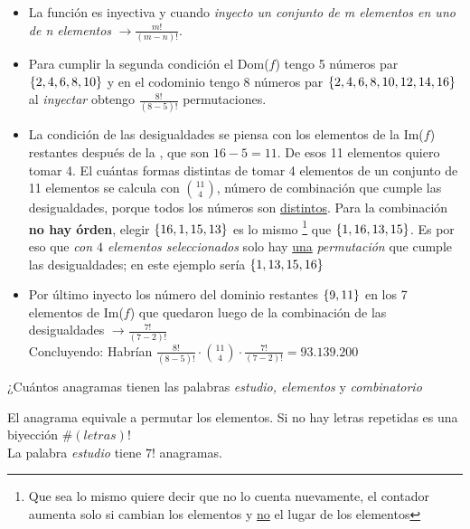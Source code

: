 \documentclass[12pt,a4paper, spanish]{article}
\begin{document}
\begin{itemize}
	\item
	      La función es inyectiva y cuando \textit{inyecto un conjunto de m elementos en uno de n elementos } $\to \frac{m!}{(m-n)!}$.

	\item
	      Para cumplir la segunda condición el Dom($f$) tengo 5 números par $\left\{ 2,4,6,8,10 \right\}$ y en el codominio tengo 8 números par
	      $\set{\foreach \i in {2,4,...,14}{\i,}16}$ al \textit{inyectar} obtengo $\frac{8!}{(8-5)!}$ permutaciones.

	\item
	      La condición de las desigualdades se piensa con los elementos de la Im($f$) restantes después de la , que son $16 - 5 = 11$.
	      De esos 11 elementos quiero tomar 4. El cuántas formas distintas de tomar 4 elementos de un conjunto de 11 elementos se calcula con $\binom{11}{4}$,
	      número de combinación que cumple las desigualdades, porque todos los números son \underline{distintos}. Para la combinación
	      \textbf{no hay órden}, elegir $\left\{ 16,1,15,13 \right\}$ es lo mismo
	      \footnote{Que sea lo mismo quiere decir que no lo cuenta nuevamente, el contador aumenta solo si cambian los
		      elementos y \underline{no} el lugar de los elementos}
	      que $\left\{ 1,16,13,15 \right\}$. Es por eso que \textit{con $4$ elementos seleccionados}
	      solo hay \underline{una} \textit{permutación} que cumple las desigualdades; en este ejemplo sería $\left\{ 1,13,15,16 \right\}$

	\item
	      Por último inyecto los número del dominio restantes $\left\{ 9,11 \right\}$ en los 7 elementos de Im($f$) que quedaron luego de la combinación de las
	      desigualdades $\to \frac{7!}{(7-2)!}$\\

	      Concluyendo: Habrían $\frac{8!}{(8-5)!} \cdot \binom{11}{4} \cdot \frac{7!}{(7-2)!} = 93.139.200$\\
\end{itemize}


\ejercicio
¿Cuántos anagramas tienen las palabras \textit{estudio, elementos} y \textit{combinatorio}\\
\separadorCorto

El anagrama equivale a permutar los elementos. Si no hay letras repetidas es una biyección $\#(letras)!$\\
La palabra \textit{estudio} tiene $7!$ anagramas.\\
\end{document}

